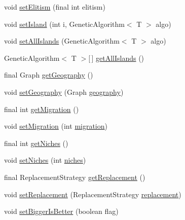 \begin{DoxyCompactItemize}
\item 
void \hyperlink{classjenes_1_1algorithms_1_1_island_g_a_3_01_t_01extends_01_chromosome_01_4_a8789904f010dfb4d86c236f16738f3cc}{set\-Elitism} (final int elitism)
\item 
void \hyperlink{classjenes_1_1algorithms_1_1_island_g_a_3_01_t_01extends_01_chromosome_01_4_aeb79089c053c729f16d8c1c5c1aa2601}{set\-Island} (int i, Genetic\-Algorithm$<$ T $>$ algo)
\item 
void \hyperlink{classjenes_1_1algorithms_1_1_island_g_a_3_01_t_01extends_01_chromosome_01_4_a46c43be9c86897a05eb25db32c0935c1}{set\-All\-Islands} (Genetic\-Algorithm$<$ T $>$ algo)
\item 
Genetic\-Algorithm$<$ T $>$\mbox{[}$\,$\mbox{]} \hyperlink{classjenes_1_1algorithms_1_1_island_g_a_3_01_t_01extends_01_chromosome_01_4_aadf9a8c907983a8ff03a6358b8270d82}{get\-All\-Islands} ()
\item 
final Graph \hyperlink{classjenes_1_1algorithms_1_1_island_g_a_3_01_t_01extends_01_chromosome_01_4_a36fb81c40aa049fc4af4c5a8ebdbc9e6}{get\-Geography} ()
\item 
void \hyperlink{classjenes_1_1algorithms_1_1_island_g_a_3_01_t_01extends_01_chromosome_01_4_ac40da22bb9de811c6a2712a67184dc06}{set\-Geography} (Graph \hyperlink{classjenes_1_1algorithms_1_1_island_g_a_3_01_t_01extends_01_chromosome_01_4_aa12c57824b7d6a8e875a75c07d9ad774}{geography})
\item 
final int \hyperlink{classjenes_1_1algorithms_1_1_island_g_a_3_01_t_01extends_01_chromosome_01_4_a74419cc71fe52538d241f7362b63709a}{get\-Migration} ()
\item 
void \hyperlink{classjenes_1_1algorithms_1_1_island_g_a_3_01_t_01extends_01_chromosome_01_4_a309c1fe9c74c728b2ecab37e91f09322}{set\-Migration} (int \hyperlink{classjenes_1_1algorithms_1_1_island_g_a_3_01_t_01extends_01_chromosome_01_4_a9bba629926d756819b7725f170b76fd4}{migration})
\item 
final int \hyperlink{classjenes_1_1algorithms_1_1_island_g_a_3_01_t_01extends_01_chromosome_01_4_a5642fdd072cd93a61d7ef3f1b5a806ad}{get\-Niches} ()
\item 
void \hyperlink{classjenes_1_1algorithms_1_1_island_g_a_3_01_t_01extends_01_chromosome_01_4_a5ad013b697d423948678c584adde46f7}{set\-Niches} (int \hyperlink{classjenes_1_1algorithms_1_1_island_g_a_3_01_t_01extends_01_chromosome_01_4_a02fc5f134e4e02b3a29afc3bce1ab46f}{niches})
\item 
final Replacement\-Strategy \hyperlink{classjenes_1_1algorithms_1_1_island_g_a_3_01_t_01extends_01_chromosome_01_4_aba40738c3ed2724093a13ec8019d2e11}{get\-Replacement} ()
\item 
void \hyperlink{classjenes_1_1algorithms_1_1_island_g_a_3_01_t_01extends_01_chromosome_01_4_a980d98b95084ac99094dac0d7d231366}{set\-Replacement} (Replacement\-Strategy \hyperlink{classjenes_1_1algorithms_1_1_island_g_a_3_01_t_01extends_01_chromosome_01_4_ab3796d8a249ad849e429bf8b996fb720}{replacement})
\item 
void \hyperlink{classjenes_1_1algorithms_1_1_island_g_a_3_01_t_01extends_01_chromosome_01_4_aedb02e8ab567910d449869a8bd778225}{set\-Bigger\-Is\-Better} (boolean flag)
\end{DoxyCompactItemize}
